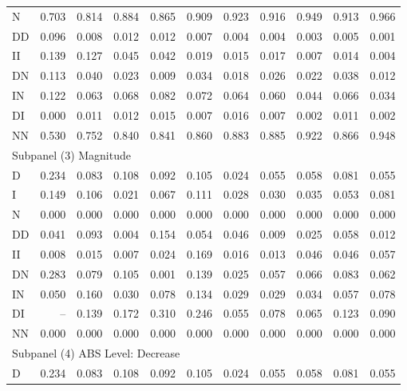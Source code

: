 {\begin{tabular}{lrrrrrrrrrr}
	N      & 0.703 & 0.814 & 0.884 & 0.865 &  0.909 &  0.923 &  0.916 &  0.949 &  0.913 &  0.966 \\
	DD     & 0.096 & 0.008 & 0.012 & 0.012 &  0.007 &  0.004 &  0.004 &  0.003 &  0.005 &  0.001 \\
	II     & 0.139 & 0.127 & 0.045 & 0.042 &  0.019 &  0.015 &  0.017 &  0.007 &  0.014 &  0.004 \\
	DN     & 0.113 & 0.040 & 0.023 & 0.009 &  0.034 &  0.018 &  0.026 &  0.022 &  0.038 &  0.012 \\
	IN     & 0.122 & 0.063 & 0.068 & 0.082 &  0.072 &  0.064 &  0.060 &  0.044 &  0.066 &  0.034 \\
	DI     & 0.000 & 0.011 & 0.012 & 0.015 &  0.007 &  0.016 &  0.007 &  0.002 &  0.011 &  0.002 \\
	NN     & 0.530 & 0.752 & 0.840 & 0.841 &  0.860 &  0.883 &  0.885 &  0.922 &  0.866 &  0.948 \\ \hline
	\multicolumn{11}{l}{Subpanel (3) Magnitude}                                                  \\ \hline
	D      & 0.234 & 0.083 & 0.108 & 0.092 &  0.105 &  0.024 &  0.055 &  0.058 &  0.081 &  0.055 \\
	I      & 0.149 & 0.106 & 0.021 & 0.067 &  0.111 &  0.028 &  0.030 &  0.035 &  0.053 &  0.081 \\
	N      & 0.000 & 0.000 & 0.000 & 0.000 &  0.000 &  0.000 &  0.000 &  0.000 &  0.000 &  0.000 \\
	DD     & 0.041 & 0.093 & 0.004 & 0.154 &  0.054 &  0.046 &  0.009 &  0.025 &  0.058 &  0.012 \\
	II     & 0.008 & 0.015 & 0.007 & 0.024 &  0.169 &  0.016 &  0.013 &  0.046 &  0.046 &  0.057 \\
	DN     & 0.283 & 0.079 & 0.105 & 0.001 &  0.139 &  0.025 &  0.057 &  0.066 &  0.083 &  0.062 \\
	IN     & 0.050 & 0.160 & 0.030 & 0.078 &  0.134 &  0.029 &  0.029 &  0.034 &  0.057 &  0.078 \\
	DI     &    -- & 0.139 & 0.172 & 0.310 &  0.246 &  0.055 &  0.078 &  0.065 &  0.123 &  0.090 \\
	NN     & 0.000 & 0.000 & 0.000 & 0.000 &  0.000 &  0.000 &  0.000 &  0.000 &  0.000 &  0.000 \\ \hline
	\multicolumn{11}{l}{Subpanel (4) ABS Level: Decrease}                                        \\ \hline
	D      & 0.234 & 0.083 & 0.108 & 0.092 &  0.105 &  0.024 &  0.055 &  0.058 &  0.081 &  0.055 \\

\end{tabular}}
